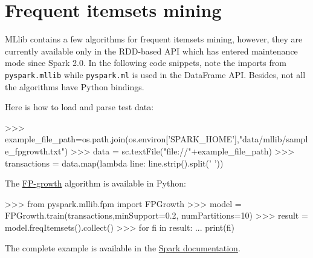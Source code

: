 \documentclass[11pt]{article}
\begin{document}
\section{Frequent itemsets mining}

MLlib contains a few algorithms for frequent itemsets mining, however,
they are currently available only in the RDD-based API which has
entered maintenance mode since Spark 2.0. In the following code
snippets, note the imports from \texttt{pyspark.mllib} while
\texttt{pyspark.ml} is used in the DataFrame API. Besides, not all the
algorithms have Python bindings.

Here is how to load and parse test data:
\begin{cli}
  >>> example_file_path=os.path.join(os.environ['SPARK_HOME'],"data/mllib/sample_fpgrowth.txt")
  >>> data = sc.textFile("file://"+example_file_path)
  >>> transactions = data.map(lambda line: line.strip().split(' '))
\end{cli}
The \href{http://dx.doi.org/10.1145/335191.335372}{FP-growth}
algorithm is available in Python:
\begin{cli}
  >>> from pyspark.mllib.fpm import FPGrowth
  >>> model  = FPGrowth.train(transactions,minSupport=0.2, numPartitions=10)
  >>> result = model.freqItemsets().collect()
  >>> for fi in result:
  ...   print(fi)
\end{cli}
The complete example is available in the
\href{https://github.com/apache/spark/blob/master/examples/src/main/python/mllib/fpgrowth_example.py}{Spark
  documentation}.
\end{document}
